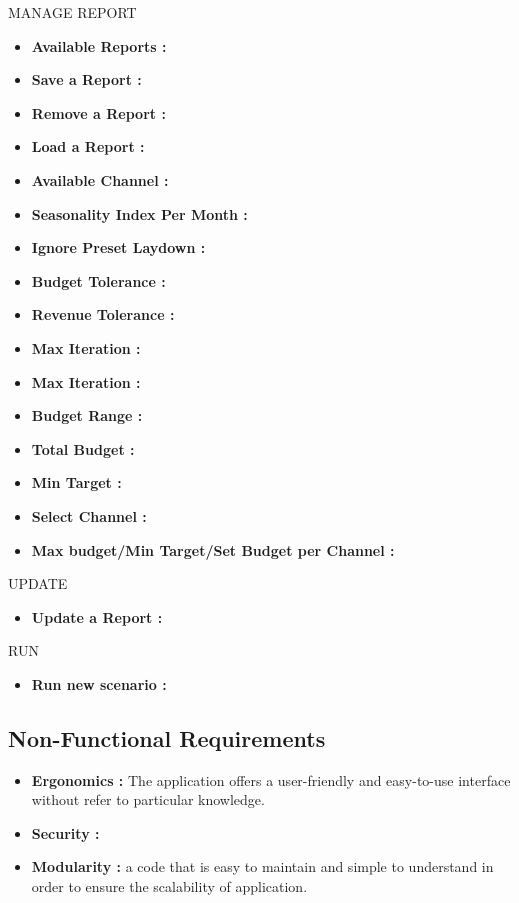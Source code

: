  	MANAGE REPORT
 		\begin{itemize}
 			\setlength{\itemindent}{+.5in}
 			\item \textbf{Available Reports : } 
 			\item \textbf{Save a Report : }
 			\item \textbf{Remove a Report : }
 			\item \textbf{Load a Report : } 
 			\item \textbf{Available Channel : } 
 			\item \textbf{Seasonality Index Per Month : }
 			\item \textbf{Ignore Preset Laydown : }
 			\item \textbf{Budget Tolerance : }
 			\item \textbf{Revenue Tolerance : }
 			\item \textbf{Max Iteration  : }
 			\item \textbf{Max Iteration  : }
 			\item \textbf{Budget Range : }
 			\item \textbf{Total Budget : }
 			\item \textbf{Min Target : }
 			\item \textbf{Select Channel : }
 			\item \textbf{Max budget/Min Target/Set Budget per Channel : }
 	\end{itemize}
 
  	UPDATE
    \begin{itemize}
    	\setlength{\itemindent}{+.5in}
    	\item \textbf{Update a Report : }
   \end{itemize}

  	RUN
   \begin{itemize}
   	   \setlength{\itemindent}{+.5in}
 	   \item \textbf{Run new scenario : }
   \end{itemize}

    \clearpage
    \newpage

	\subsection{Non-Functional Requirements}
	\begin{itemize}
		\item \textbf{Ergonomics : }The application offers a user-friendly and easy-to-use interface without refer to particular knowledge.
		\item \textbf{Security : }
		\item \textbf{Modularity : }a code that is easy to maintain and simple to understand in order to ensure the scalability of application. 
	\end{itemize}
	\clearpage
	\newpage
	
